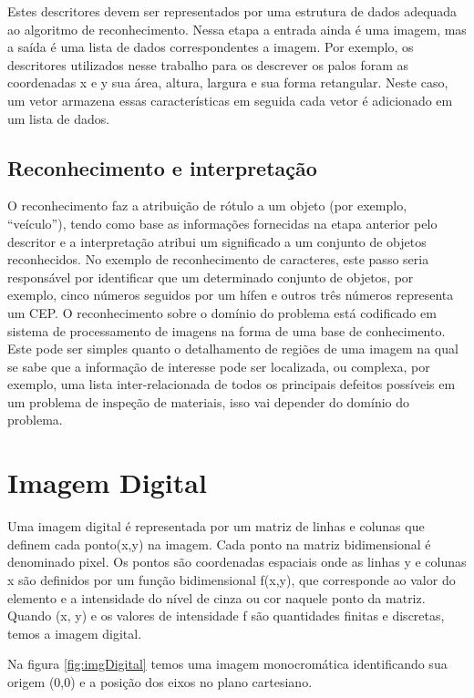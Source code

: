 Estes descritores devem ser representados por uma estrutura de dados adequada ao algoritmo de reconhecimento. Nessa etapa a entrada ainda é uma imagem, mas a saída é uma lista de dados correspondentes a imagem. Por exemplo, os descritores utilizados nesse trabalho para os descrever os palos foram as coordenadas x e y sua área, altura, largura e sua forma retangular. Neste caso, um vetor armazena essas características em seguida cada vetor é adicionado em um lista de dados. 

\subsection{Reconhecimento e interpretação}
\label{sub:rec-intr}

O reconhecimento faz a atribuição de rótulo a um objeto (por exemplo, “veículo”), tendo como base as informações fornecidas na etapa anterior pelo descritor e a interpretação atribui um significado a um conjunto de objetos reconhecidos. No exemplo de reconhecimento de caracteres, este passo seria responsável por identificar que um determinado conjunto de objetos, por exemplo, cinco números seguidos por um hífen e outros três números representa um CEP. O reconhecimento sobre o domínio do problema está codificado em sistema de processamento de imagens na forma de uma base de conhecimento. Este pode ser simples quanto o detalhamento de regiões de uma imagem na qual se sabe que a informação de interesse pode ser localizada, ou complexa, por exemplo, uma lista inter-relacionada de todos os principais defeitos possíveis em um problema de inspeção de materiais, isso vai depender do domínio do problema.\cite{digitalImgProcess2010}


\section{Imagem Digital}
\label{sec:img}

Uma imagem digital é representada por um matriz de linhas e colunas que definem cada ponto(x,y) na imagem. Cada ponto na matriz bidimensional é denominado pixel. Os pontos são coordenadas espaciais onde as linhas y e colunas x são definidos por um função bidimensional f(x,y), que corresponde ao valor do elemento e a intensidade do nível de cinza ou cor naquele ponto da matriz. Quando (x, y) e os valores de intensidade f são quantidades finitas e discretas, temos a imagem digital. \cite{ImgDigital2001} 

Na figura \ref{fig:imgDigital} temos uma imagem monocromática identificando sua origem  (0,0) e a posição dos eixos no plano cartesiano.

